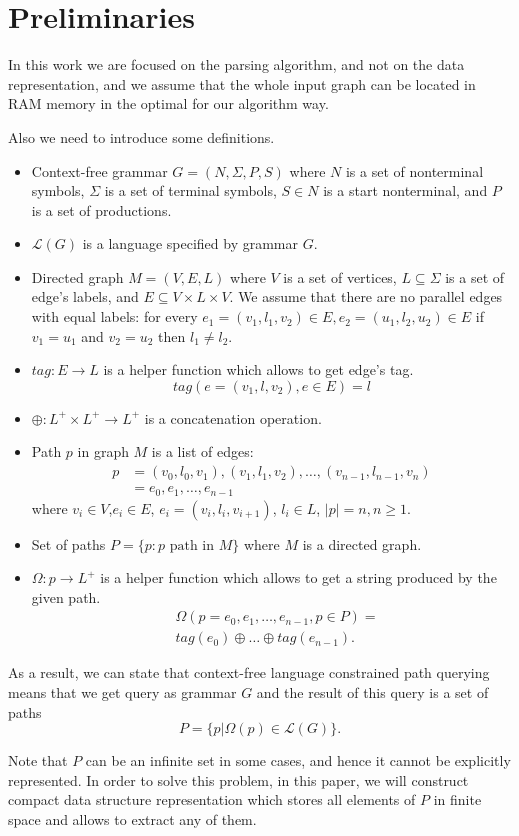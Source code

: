 \section{Preliminaries}

In this work we are focused on the parsing algorithm, and not on the data representation, and we assume that the whole input graph can be located in RAM memory in the optimal for our algorithm way.

Also we need to introduce some definitions.
\begin{itemize}
  \item Context-free grammar $G=(N, \Sigma, P, S)$ where $N$ is a set of nonterminal symbols, $\Sigma$ is a set of terminal symbols, $S \in N$ is a start nonterminal, and $P$ is a set of productions. 
  \item $\mathcal{L}(G)$ is a language specified by grammar $G$.
  \item Directed graph $M = (V,E,L)$ where $V$ is a set of vertices, $L \subseteq \Sigma$ is a set of edge's labels, and $E\subseteq V\times L\times V$. 
  We assume that there are no parallel edges with equal labels: for every $e_1=(v_1,l_1,v_2) \in E, e_2=(u_1,l_2,u_2) \in E$ if $v_1 = u_1$ and $v_2 = u_2$ then $l_1 \neq l_2$.
  \item $tag: E \rightarrow L$ is a helper function which allows to get edge's tag. $$tag(e = (v_1,l,v_2), e \in E) = l$$
  \item $\oplus: L^+ \times L^+ \rightarrow L^+$ is a concatenation operation.
  \item Path $p$ in graph $M$ is a list of edges: 
  \begin{align*}
   p &= (v_0,l_0,v_1),(v_1,l_1,v_2),\dots,(v_{n-1},l_{n-1},v_n) \\
     &= e_0,e_1,\dots,e_{n-1}
  \end{align*}
  where $v_i \in V$,$e_i \in E$, $e_i=(v_i,l_i,v_{i+1})$, $l_i \in L$, $|p| = n, n \geq 1$. 
  \item Set of paths $P = \{p: p \text{ path in } M\}$ where $M$ is a directed graph.
  \item $\Omega: p \rightarrow L^+$ is a helper function which allows to get a string produced by the given path. 
  \begin{align*}
  & \Omega(p = e_{0},e_{1},\dots,e_{n-1}, p \in P) = \\
  & tag (e_{0}) \oplus \dots \oplus tag (e_{n-1}).
  \end{align*}
\end{itemize}

As a result, we can state that context-free language constrained path querying means that we get query as grammar $G$ and the result of this query is a set of paths $$P=\{p|\Omega(p) \in \mathcal{L}(G)\}.$$

Note that $P$ can be an infinite set in some cases, and hence it cannot be explicitly represented. 
In order to solve this problem, in this paper, we will construct compact data structure representation which stores all elements of $P$ in finite space and allows to extract any of them.
